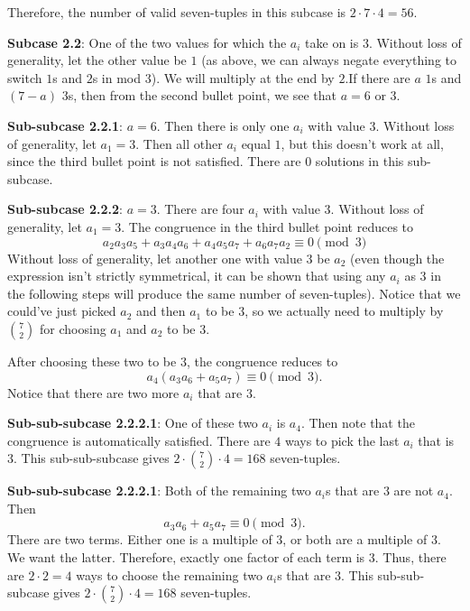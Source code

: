 \begin{enumerate}
 Therefore, the number of valid seven-tuples in this subcase is $2 \cdot7 \cdot 4 = 56$.

 
\textbf{Subcase 2.2}: One of the two values for which the $a_i$ take on is $3$. Without loss of generality, let the other value be $1$ (as above, we can always negate everything to switch $1$s and $2$s in mod $3$). We will multiply at the end by $2$.If there are $a$ $1$s and $(7-a)$ $3$s, then from the second bullet point, we see that $a = 6$ or $3$.

 
\textbf{Sub-subcase 2.2.1}: $a = 6$. Then there is only one $a_i$ with value $3$. Without loss of generality, let $a_1 = 3$. Then all other $a_i$ equal $1$, but this doesn't work at all, since the third bullet point is not satisfied. There are $0$ solutions in this sub-subcase.

 
\textbf{Sub-subcase 2.2.2}: $a = 3$. There are four $a_i$ with value $3$. Without loss of generality, let $a_1 = 3$. The congruence in the third bullet point reduces to
 \[a_2a_3a_5 + a_3a_4a_6 + a_4a_5a_7 + a_6a_7a_2 \equiv 0 \pmod 3\]Without loss of generality, let another one with value $3$ be $a_2$ (even though the expression isn't strictly symmetrical, it can be shown that using any $a_i$ as $3$ in the following steps will produce the same number of seven-tuples). Notice that we could've just picked $a_2$ and then $a_1$ to be $3$, so we actually need to multiply by $\binom{7}{2}$ for choosing $a_1$ and $a_2$ to be $3$.

 
After choosing these two to be $3$, the congruence reduces to
 \[a_4(a_3a_6 + a_5a_7) \equiv 0 \pmod 3.\]Notice that there are two more $a_i$ that are $3$.

 
\textbf{Sub-sub-subcase 2.2.2.1}: One of these two $a_i$ is $a_4$. Then note that the congruence is automatically satisfied. There are $4$ ways to pick the last $a_i$ that is $3$. This sub-sub-subcase gives $2 \cdot \binom{7}{2} \cdot 4 = 168$ seven-tuples.

 
\textbf{Sub-sub-subcase 2.2.2.1}: Both of the remaining two $a_i$s that are $3$ are not $a_4$. Then
 \[a_3a_6 + a_5a_7 \equiv 0 \pmod 3.\]There are two terms. Either one is a multiple of $3$, or both are a multiple of $3$. We want the latter. Therefore, exactly one factor of each term is $3$. Thus, there are $2 \cdot 2 = 4$ ways to choose the remaining two $a_i$s that are $3$. This sub-sub-subcase gives $2 \cdot \binom{7}{2} \cdot 4 = 168$ seven-tuples.

 



\end{enumerate}
